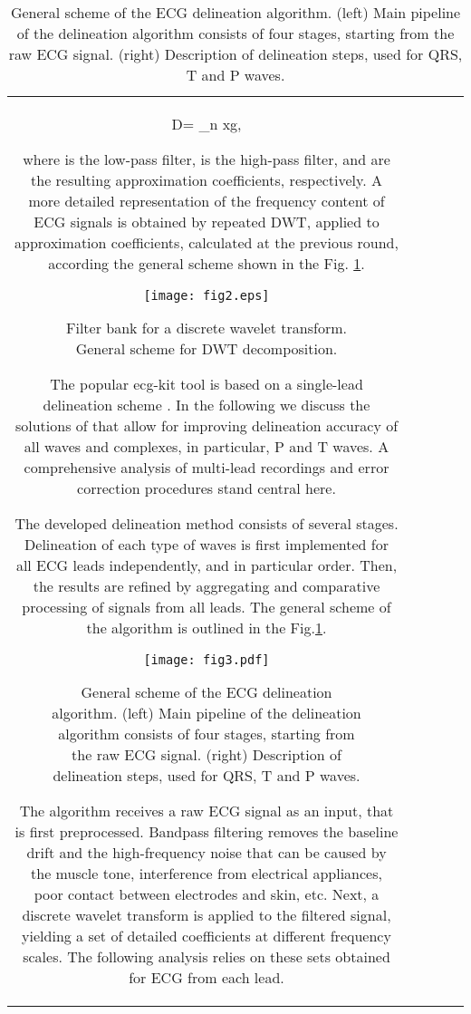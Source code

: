 \documentclass[submitted]{ieeeaccess}
\newcommand{\NewCorrection}[1]{{#1}}
\begin{document}
\begin{table}
\begin{tabular}{|c|c|c|c|c|}
	D\left[k\right] = \sum_{n} x\left[n\right] \cdot g\left[2k-n\right],
	
where  is the low-pass filter,  is the high-pass filter,  and  are the resulting approximation coefficients, respectively. A more detailed representation of the frequency content of ECG signals is obtained by repeated DWT, applied to approximation coefficients, calculated at the previous round, according the general scheme shown in the Fig. \ref{fig2}.

\begin{figure}
    \centering
	\texttt{[image: fig2.eps]}
	
	\caption{Filter bank for a discrete wavelet transform. General scheme for DWT decomposition.}
	\label{fig2}
\end{figure}

The popular ecg-kit tool \cite{ECGKit} is based on a single-lead delineation scheme \cite{Martinez2004}. In the following we discuss the solutions of \cite{Kalyakulina2018} that allow for improving delineation accuracy of all waves and complexes, in particular, P and T waves. A \NewCorrection{comprehensive} analysis of multi-lead recordings and error correction procedures stand central here.  

The developed delineation method consists of several stages. Delineation of each type of waves is first implemented for all ECG leads independently, and in particular order. Then, the results are refined by aggregating and comparative processing of signals from all leads. The general scheme of the algorithm is outlined in the Fig.\ref{fig3}.

\begin{figure}
    \centering
	\texttt{[image: fig3.pdf]}
	
	\caption{{General scheme of the ECG delineation algorithm.}
		(left) Main pipeline of the delineation algorithm consists of four stages, starting from the raw ECG signal. (right) Description of delineation steps, used for QRS, T and P waves.}
	\label{fig3}
\end{figure}

The algorithm receives a raw ECG signal as an input, that is first preprocessed. Bandpass filtering removes the baseline drift and the high-frequency noise that can be caused by the muscle tone, interference from electrical appliances, poor contact between electrodes and skin, etc. Next, a discrete wavelet transform is applied to the filtered signal, yielding a set of detailed coefficients at different frequency scales. The following analysis relies on these sets obtained for ECG from each lead. 


\end{tabular}
\end{table}
\end{document}

